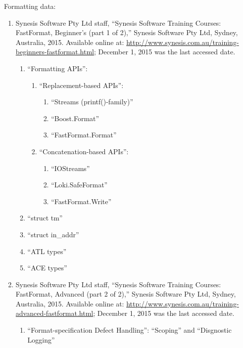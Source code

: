 Formatting data: \vspace{-0.3cm}
\begin{enumerate} \itemsep -4pt
\item Synesis Software Pty Ltd staff, ``Synesis Software Training Courses: FastFormat, Beginner's (part 1 of 2),'' Synesis Software Pty Ltd, Sydney, Australia, 2015.  Available online at: \url{http://www.synesis.com.au/training-beginners-fastformat.html}; December 1, 2015 was the last accessed date. \vspace{-0.3cm}
	\begin{enumerate} \itemsep -2pt
	\item ``Formatting APIs'': \vspace{-0.2cm}
		\begin{enumerate} \itemsep -2pt
		\item ``Replacement-based APIs'': \vspace{-0.1cm}
			\begin{enumerate} \itemsep -1pt
			\item ``Streams (printf()-family)''
			\item ``Boost.Format''
			\item ``FastFormat.Format''
			\end{enumerate}
		\item ``Concatenation-based APIs'': \vspace{-0.1cm}
			\begin{enumerate} \itemsep -1pt
			\item ``IOStreams''
			\item ``Loki.SafeFormat''
			\item ``FastFormat.Write''
			\end{enumerate}
		\end{enumerate}
	\item ``struct tm''
	\item ``struct in\_addr''	%
	\item ``ATL types''
	\item ``ACE types''
	\end{enumerate}
\item Synesis Software Pty Ltd staff, ``Synesis Software Training Courses: FastFormat, Advanced (part 2 of 2),'' Synesis Software Pty Ltd, Sydney, Australia, 2015.  Available online at: \url{http://www.synesis.com.au/training-advanced-fastformat.html}; December 1, 2015 was the last accessed date. \vspace{-0.3cm}
	\begin{enumerate} \itemsep -2pt
	\item ``Format-specification Defect Handling'': ``Scoping'' and ``Disgnostic Logging''
	\end{enumerate}
\end{enumerate}

















